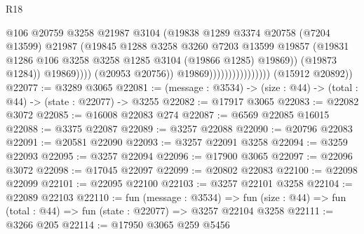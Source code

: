 \begin{lexlean}{R18}
\begin{coremodule}
                                                @106
                                                @20759
                                                @3258
                                                @21987
                                                @3104
                                                (@19838
                                                  @1289
                                                  @3374
                                                  @20758
                                                  (@7204 @13599)
                                                  @21987
                                                  (@19845
                                                    @1288
                                                    @3258
                                                    @3260
                                                    @7203
                                                    @13599
                                                    @19857
                                                    (@19831
                                                      @1286
                                                      @106
                                                      @3258
                                                      @3258
                                                      @1285
                                                      @3104
                                                      (@19866 @1285)
                                                      @19869))
                                                  (@19873 @1284))
                                                @19869))))
                                        (@20953 @20756))
                                      @19869))))))))))))))))
      (@15912 @20892))
@22077 := @3289 @3065
@22081 := (message : @3534) -> (size : @44) -> (total : @44) -> (state : @22077) -> @3255
@22082 := @17917 @3065
@22083 := @22082 @3072
@22085 := @16008 @22083 @274
@22087 := @6569 @22085 @16015
@22088 := @3375 @22087
@22089 := @3257 @22088
@22090 := @20796 @22083
@22091 := @20581 @22090
@22093 := @3257 @22091 @3258
@22094 := @3259 @22093
@22095 := @3257 @22094
@22096 := @17900 @3065
@22097 := @22096 @3072
@22098 := @17045 @22097
@22099 := @20802 @22083
@22100 := @22098 @22099
@22101 := @22095 @22100
@22103 := @3257 @22101 @3258
@22104 := @22089 @22103
@22110 := fun (message : @3534) =>
  fun (size : @44) => fun (total : @44) => fun (state : @22077) => @3257 @22104 @3258
@22111 := @3266 @205
@22114 := @17950 @3065 @259 @5456

\end{coremodule}
\end{lexlean}
